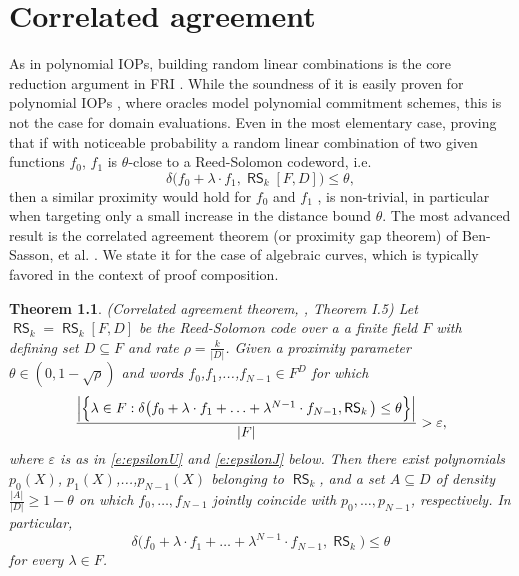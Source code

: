 \documentclass[11pt,article,oneside]{memoir}
\newtheorem{thm}{Theorem}[]
\theoremstyle{definition}
\theoremstyle{remark}
\DeclareMathOperator{\RS}{\mathsf{RS}}
\begin{document}
\chapter{Correlated agreement}

As in polynomial IOPs, building random linear combinations is the core reduction argument in FRI . 
While the soundness of it is easily proven for polynomial IOPs \cite{DARK}, where oracles model polynomial commitment schemes, this is not the case for domain evaluations. 
Even in the most elementary case, proving that if with noticeable probability a random linear combination  of two  given functions $f_0$, $f_1$ is $\theta$-close to a Reed-Solomon codeword, i.e.
\[
\delta\big(f_0 + \lambda\cdot f_1, \RS_k[F,D]\big) \leq \theta,
\]
 then a similar proximity  would hold for $f_0$ and $f_1$ , is non-trivial, in particular when targeting only a small increase in the distance bound $\theta$.  
The most advanced result is the correlated agreement theorem (or proximity gap theorem) of Ben-Sasson, et al. \cite{ProximityGaps}.
We state it for the case of algebraic curves, which is typically favored in the context of proof composition.

\begin{thm}
\label{thm:CorrelatedAgreement}
(Correlated agreement theorem, \cite{ProximityGaps}, Theorem I.5)
Let $\RS_k = \RS_k[F,D]$ be the Reed-Solomon code over a a finite field $F$ with defining set $D\subseteq F$ and rate $\rho=\frac{k}{|D|}$.
Given a proximity parameter $\theta\in (0,1-\sqrt\rho)$  and words $f_0$,$f_1$,...,$f_{N-1}\in F^D$ for which
\begin{equation*}
\frac{%
	\Big|\Big\{\lambda\in F : \delta\big(f_0 + \lambda\cdot f_1 + \ldots + \lambda^{N-1}\cdot f_{N-1}, \RS_k\big) \leq \theta \Big\} \Big|
}{|F|} > \varepsilon,
\end{equation*}
where $\varepsilon$ is as in \eqref{e:epsilonU} and \eqref{e:epsilonJ}  below.
Then there exist polynomials $p_0(X)$, $p_1(X)$,...,$p_{N-1}(X)$ belonging to $\RS_k$, and a set $A\subseteq D$ of density 
$
\frac{|A|}{|D|}\geq 1 - \theta
$ 
on which $f_0, \ldots, f_{N-1}$ jointly coincide with $p_0, \ldots, p_{N-1}$, respectively. 
In particular, 
\begin{equation*}
\delta\big(f_0 + \lambda\cdot f_1 + \ldots + \lambda^{N-1}\cdot f_{N-1}, \RS_k\big) \leq \theta
\end{equation*}
for every $\lambda\in F$. 
\end{thm}
\end{document}
